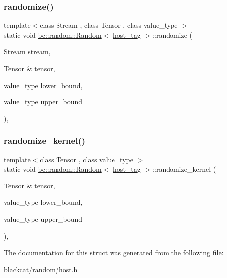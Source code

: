 \subsubsection{\texorpdfstring{randomize()}{randomize()}}
{\footnotesize\ttfamily template$<$class Stream , class Tensor , class value\+\_\+type $>$ \\
static void \hyperlink{structbc_1_1random_1_1Random}{bc\+::random\+::\+Random}$<$ \hyperlink{structbc_1_1host__tag}{host\+\_\+tag} $>$\+::randomize (\begin{DoxyParamCaption}\item[{\hyperlink{classbc_1_1streams_1_1Stream}{Stream}}]{stream,  }\item[{\hyperlink{namespacebc_a659391e47ab612be3ba6c18cf9c89159}{Tensor} \&}]{tensor,  }\item[{value\+\_\+type}]{lower\+\_\+bound,  }\item[{value\+\_\+type}]{upper\+\_\+bound }\end{DoxyParamCaption})\hspace{0.3cm}{\ttfamily [inline]}, {\ttfamily [static]}}

\mbox{\label{structbc_1_1random_1_1Random_3_01host__tag_01_4_a889a0e830af5dbe593a65c012829ade0}} 
\subsubsection{\texorpdfstring{randomize\+\_\+kernel()}{randomize\_kernel()}}
{\footnotesize\ttfamily template$<$class Tensor , class value\+\_\+type $>$ \\
static void \hyperlink{structbc_1_1random_1_1Random}{bc\+::random\+::\+Random}$<$ \hyperlink{structbc_1_1host__tag}{host\+\_\+tag} $>$\+::randomize\+\_\+kernel (\begin{DoxyParamCaption}\item[{\hyperlink{namespacebc_a659391e47ab612be3ba6c18cf9c89159}{Tensor} \&}]{tensor,  }\item[{value\+\_\+type}]{lower\+\_\+bound,  }\item[{value\+\_\+type}]{upper\+\_\+bound }\end{DoxyParamCaption})\hspace{0.3cm}{\ttfamily [inline]}, {\ttfamily [static]}}



The documentation for this struct was generated from the following file\+:\begin{DoxyCompactItemize}
\item 
blackcat/random/\hyperlink{random_2host_8h}{host.\+h}\end{DoxyCompactItemize}
